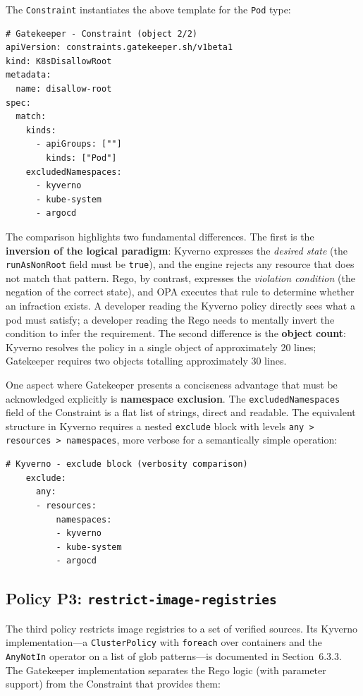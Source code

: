 The \texttt{Constraint} instantiates the above template for the \texttt{Pod} type:

\begin{lstlisting}
# Gatekeeper - Constraint (object 2/2)
apiVersion: constraints.gatekeeper.sh/v1beta1
kind: K8sDisallowRoot
metadata:
  name: disallow-root
spec:
  match:
    kinds:
      - apiGroups: [""]
        kinds: ["Pod"]
    excludedNamespaces:
      - kyverno
      - kube-system
      - argocd
\end{lstlisting}

The comparison highlights two fundamental differences. The first is the \textbf{inversion of the logical paradigm}: Kyverno expresses the \textit{desired state} (the \texttt{runAsNonRoot} field must be \texttt{true}), and the engine rejects any resource that does not match that pattern. Rego, by contrast, expresses the \textit{violation condition} (the negation of the correct state), and OPA executes that rule to determine whether an infraction exists. A developer reading the Kyverno policy directly sees what a pod must satisfy; a developer reading the Rego needs to mentally invert the condition to infer the requirement. The second difference is the \textbf{object count}: Kyverno resolves the policy in a single object of approximately 20 lines; Gatekeeper requires two objects totalling approximately 30 lines.

One aspect where Gatekeeper presents a conciseness advantage that must be acknowledged explicitly is \textbf{namespace exclusion}. The \texttt{excludedNamespaces} field of the Constraint is a flat list of strings, direct and readable. The equivalent structure in Kyverno requires a nested \texttt{exclude} block with levels \texttt{any > resources > namespaces}, more verbose for a semantically simple operation:

\begin{lstlisting}
# Kyverno - exclude block (verbosity comparison)
    exclude:
      any:
      - resources:
          namespaces:
          - kyverno
          - kube-system
          - argocd
\end{lstlisting}

\subsection{Policy P3: \texttt{restrict-image-registries}}

The third policy restricts image registries to a set of verified sources. Its Kyverno implementation---a \texttt{ClusterPolicy} with \texttt{foreach} over containers and the \texttt{AnyNotIn} operator on a list of glob patterns---is documented in Section~6.3.3. The Gatekeeper implementation separates the Rego logic (with parameter support) from the Constraint that provides them:

